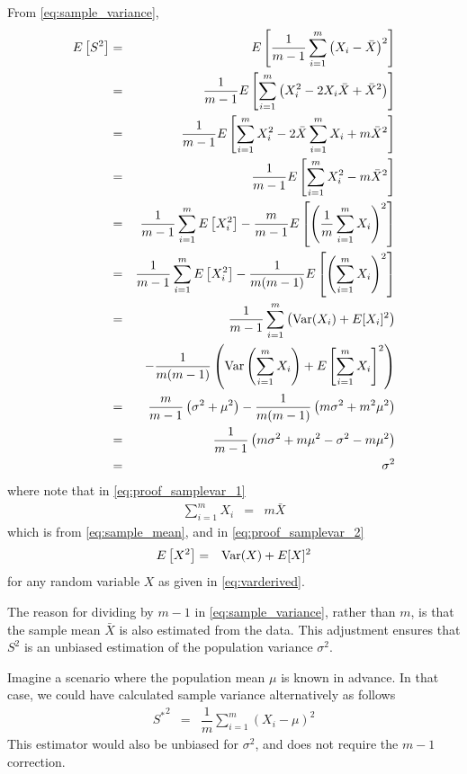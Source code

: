From \eqref{eq:sample_variance},
\begin{eqnarray}
	E\left[S^2\right] &=& E\left[\dfrac{1}{m-1}\sum_{i=1}^{m}\left(X_i - \bar{X}\right)^2\right] \nonumber \\
	&=& \dfrac{1}{m-1} E\left[\sum_{i=1}^{m}\left(X_i^2 - 2X_i\bar{X} + \bar{X}^2\right)\right]  \nonumber \\
	&=& \dfrac{1}{m-1} E\left[\sum_{i=1}^{m}X_i^2 - 2\bar{X}\sum_{i=1}^{m}X_i + m\bar{X}^2\right] \label{eq:proof_samplevar_1} \\
	&=& \dfrac{1}{m-1} E\left[\sum_{i=1}^{m}X_i^2 - m\bar{X}^2\right] \nonumber \\
	&=& \dfrac{1}{m-1}\sum_{i=1}^{m} E\left[X_i^2\right] - \dfrac{m}{m-1}E\left[\left(\dfrac{1}{m}\sum_{i=1}^{m}X_i\right)^2\right] \nonumber \\
	&=& \dfrac{1}{m-1}\sum_{i=1}^{m} E\left[X_i^2\right] - \dfrac{1}{m(m-1)}E\left[\left(\sum_{i=1}^{m}X_i\right)^2\right] \label{eq:proof_samplevar_2} \\
	&=& \dfrac{1}{m-1}\sum_{i=1}^{m} \left(\textup{Var}(X_i) + E[X_i]^2\right) \nonumber \\ && -  \dfrac{1}{m(m-1)}\left(\textup{Var}\left(\sum_{i=1}^{m}X_i\right) + E\left[\sum_{i=1}^{m}X_i\right]^2\right) \nonumber \\
	&=& \dfrac{m}{m-1}\left(\sigma^2 + \mu^2\right) - \dfrac{1}{m(m-1)}\left(m\sigma^2 + m^2\mu^2\right) \nonumber \\
	&=& \dfrac{1}{m-1}\left(m\sigma^2 + m\mu^2 - \sigma^2 - m\mu^2\right) \nonumber \\
	&=& \sigma^2 \nonumber
\end{eqnarray}
where note that in \eqref{eq:proof_samplevar_1} 
\begin{eqnarray}
	\sum_{i=1}^{m}X_i &=& m\bar{X} \nonumber
\end{eqnarray}
which is from \eqref{eq:sample_mean}, and in \eqref{eq:proof_samplevar_2}
\begin{eqnarray}
	E\left[X^2\right] &=& \textup{Var}(X) + E[X]^2 \nonumber
\end{eqnarray}
for any random variable $X$ as given in \eqref{eq:varderived}.

The reason for dividing by $m-1$ in \eqref{eq:sample_variance}, rather than $m$, is that the sample mean $\bar{X}$ is also estimated from the data. This adjustment ensures that $S^2$ is an unbiased estimation of the population variance $\sigma^2$.

Imagine a scenario where the population mean $\mu$ is known in advance. In that case, we could have calculated sample variance alternatively as follows
\begin{eqnarray}
	{S^*}^2 &=& \dfrac{1}{m}\sum_{i=1}^{m}\left(X_i - \mu\right)^2 \nonumber
\end{eqnarray}
This estimator would also be unbiased for $\sigma^2$, and does not require the $m-1$ correction.

